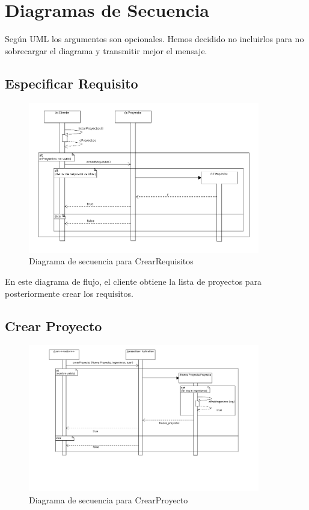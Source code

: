 \documentclass[a4paper, spanish]{article}
\begin{document}
\section{Diagramas de Secuencia}
Según UML los argumentos son opcionales.
Hemos decidido no incluirlos para no sobrecargar el diagrama y transmitir mejor el mensaje.

\pagebreak\subsection{Especificar Requisito} %
\begin{figure}[h!]
\centering
\includegraphics[width=0.9\textwidth]{diagramas/diagramasSecuencia/CrearRequisito_sd.png}
\caption{Diagrama de secuencia para CrearRequisitos}
\end{figure}
En este diagrama de flujo, el cliente obtiene la lista de proyectos para posteriormente crear los requisitos.


\pagebreak\subsection{Crear Proyecto} %
\begin{figure}[h!]
\centering
\includegraphics[width=0.9\textwidth]{diagramas/diagramasSecuencia/CrearProyecto_sd.png}
\caption{Diagrama de secuencia para CrearProyecto}
\end{figure}
\end{document}
